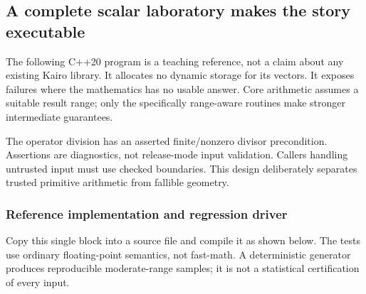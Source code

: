 \subsection{A complete scalar laboratory makes the story executable}\label{a-complete-scalar-laboratory-makes-the-story-executable}

The following C++20 program is a teaching reference, not a claim about any existing Kairo library. It allocates no dynamic storage for its vectors. It exposes failures where the mathematics has no usable answer. Core arithmetic assumes a suitable result range; only the specifically range-aware routines make stronger intermediate guarantees.

The operator division has an asserted finite/nonzero divisor precondition. Assertions are diagnostics, not release-mode input validation. Callers handling untrusted input must use checked boundaries. This design deliberately separates trusted primitive arithmetic from fallible geometry.

\subsubsection{Reference implementation and regression driver}\label{reference-implementation-and-regression-driver}

Copy this single block into a source file and compile it as shown below. The tests use ordinary floating-point semantics, not fast-math. A deterministic generator produces reproducible moderate-range samples; it is not a statistical certification of every input.

